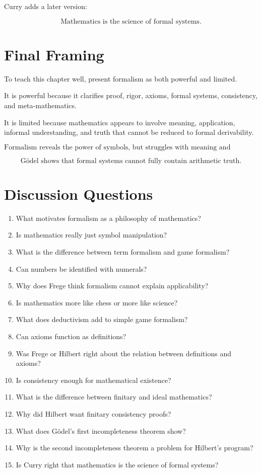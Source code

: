 \documentclass[11pt]{article}
\begin{document}
Curry adds a later version:

\[
\boxed{
\text{Mathematics is the science of formal systems.}
}
\]

\section*{Final Framing}

To teach this chapter well, present formalism as both powerful and limited.

It is powerful because it clarifies proof, rigor, axioms, formal systems, consistency, and
meta-mathematics.

It is limited because mathematics appears to involve meaning, application, informal
understanding, and truth that cannot be reduced to formal derivability.

\[
\boxed{
\text{Formalism reveals the power of symbols, but struggles with meaning and application.}
}
\]

\[
\boxed{
\text{G\"odel shows that formal systems cannot fully contain arithmetic truth.}
}
\]

\section*{Discussion Questions}

\begin{enumerate}[leftmargin=2em]
    \item What motivates formalism as a philosophy of mathematics?
    \item Is mathematics really just symbol manipulation?
    \item What is the difference between term formalism and game formalism?
    \item Can numbers be identified with numerals?
    \item Why does Frege think formalism cannot explain applicability?
    \item Is mathematics more like chess or more like science?
    \item What does deductivism add to simple game formalism?
    \item Can axioms function as definitions?
    \item Was Frege or Hilbert right about the relation between definitions and axioms?
    \item Is consistency enough for mathematical existence?
    \item What is the difference between finitary and ideal mathematics?
    \item Why did Hilbert want finitary consistency proofs?
    \item What does G\"odel's first incompleteness theorem show?
    \item Why is the second incompleteness theorem a problem for Hilbert's program?
    \item Is Curry right that mathematics is the science of formal systems?
\end{enumerate}
\end{document}

